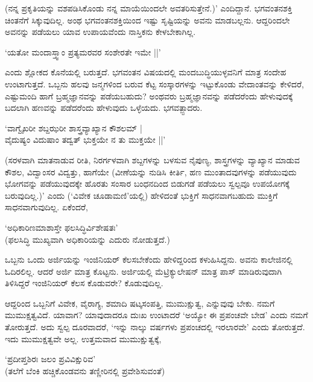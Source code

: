 (ನನ್ನ ಪ್ರಕೃತಿಯನ್ನು ವಶಪಡಿಸಿಕೊಂಡು ನನ್ನ ಮಾಯೆಯಿಂದಲೇ ಅವತರಿಸುತ್ತೇನೆ.)' ಎಂದಿದ್ದಾನೆ. ಭಗವಂತನಶಕ್ತಿ ಚಿಂತನೆಗೆ ಸಿಕ್ಕುವುದಿಲ್ಲ. ಅಂಥ ಭಗವಂತನಶಕ್ತಿಯಿಂದ ಇಷ್ಟು ಸೃಷ್ಟಿಯನ್ನು ಅವನು ಮಾಡಬಲ್ಲನು. ಆದ್ದರಿಂದಲೇ ಅವನನ್ನು ಪಡೆಯಲು ಯಾವ ಉಪಾಯವೆಂದು ನಾಸ್ತಿಕನು ಕೇಳಬೇಕಾಗಿಲ್ಲ.

\begin{shloka}
`ಯತೋ ಮಂದಾಸ್ತ್ವಾಂ ಪ್ರತ್ಯಮರವರ ಸಂಶೇರತೇ ಇಮೇ ||'
\end{shloka}

ಎಂದು ಶ್ಲೋಕದ ಕೊನೆಯಲ್ಲಿ ಬರುತ್ತದೆ. ಭಗವಂತನ ವಿಷಯದಲ್ಲಿ ಮಂದಬುದ್ಧಿಯುಳ್ಳವನಿಗೆ ಮಾತ್ರ ಸಂದೇಹ ಉಂಟಾಗುತ್ತದೆ. ಒಬ್ಬನು ಹಲವು ಜನ್ಮಗಳಿಂದ ಬರುವ ಕೆಟ್ಟ ಸಂಸ್ಕಾರಗಳನ್ನು ಇಟ್ಟುಕೊಂಡು ವೇದಾಂತವನ್ನು ಕೇಳಿದರೆ, ಎಷ್ಟುಮಂದಿ ಹಾಗೆ ಬ್ರಹ್ಮಜ್ಞಾನವನ್ನು ಪಡೆಯಬಹುದು? ಅಂಥವರು ಬ್ರಹ್ಮಜ್ಞಾನವನ್ನು ಪಡೆದರೆಂದು ಹೇಳುವುದಕ್ಕೆ ಬದಲಾಗಿ ಹಣವನ್ನು ಪಡೆದರೆಂದು ಹೇಳುವುದು ಒಳ್ಳೆಯದು. ಭಗವತ್ಪ್ಪಾದರು.

\begin{shloka}
`ವಾಗ್ವೈಖರೀ ಶಬ್ದಝರೀ ಶಾಸ್ತ್ರವ್ಯಾಖ್ಯಾನ ಕೌಶಲಮ್ |\\
ವೈದುಷ್ಯಂ ವಿದುಷಾಂ ತದ್ವತ್ ಭುಕ್ತಯೇ ನ ತು ಮುಕ್ತಯೇ ||'
\end{shloka}

(ಸರಳವಾಗಿ ಮಾತನಾಡುವ ರೀತಿ, ನಿರರ್ಗಳವಾಗಿ ಶಬ್ದಗಳನ್ನು ಬಳಸುವ ನೈಪುಣ್ಯ, ಶಾಸ್ತ್ರಗಳನ್ನು ವ್ಯಾಖ್ಯಾನ ಮಾಡುವ ಕೌಶಲ, ವಿದ್ವಾಂಸರ ವಿದ್ವತ್ತು, ಹಾಗೆಯೇ (ವೀಣೆಯನ್ನು ನುಡಿಸಿ ಕೀರ್ತಿ, ಹಣ ಮುಂತಾದವುಗಳನ್ನು ಪಡೆಯುವುದು ಭೋಗವನ್ನು ಪಡೆಯುವುದಕ್ಕೇ ಹೊರತು ಸಂಸಾರ ಬಂಧನದಿಂದ ಬಿಡುಗಡೆ ಪಡೆಯಲು ಸ್ವಲ್ಪವೂ ಉಪಯೋಗಕ್ಕೆ ಬರುವುದಿಲ್ಲ.)' ಎಂದು (`ವಿವೇಕ ಚೂಡಾಮಣಿ'ಯಲ್ಲಿ) ಹೇಳಿದಂತೆ ಭುಕ್ತಿಗೆ ಸಾಧನವಾಗಬಹುದು ಮುಕ್ತಿಗೆ ಸಾಧನವಾಗುವುದಿಲ್ಲ. ಏಕೆಂದರೆ,

\begin{shloka}
`ಅಧಿಕಾರಿಣಮಾಶಾಸ್ತೇ ಫಲಸಿದ್ಧಿರ್ವಿಶೇಷತಃ'\\
(ಫಲಸಿದ್ಧಿ ಮುಖ್ಯವಾಗಿ ಅಧಿಕಾರಿಯನ್ನು ಎದುರು ನೋಡುತ್ತದೆ.)
\end{shloka}

ಒಬ್ಬನು ಒಂದು ಅರ್ಜಿಯನ್ನು ಇಂಜಿನಿಯರ್ ಕೆಲಸಬೇಕೆಂದು ಹೇಳಿದ್ದರಿಂದ ಕಳುಹಿಸಿದ್ದನು. ಅವನು ಕಾಲೇಜಿನಲ್ಲಿ ಓದಿರಲಿಲ್ಲ. ಆದರೆ ಅರ್ಜಿ ಮಾತ್ರ ಕೊಟ್ಟನು. ಅರ್ಜಿಯಲ್ಲಿ ಮೆಟ್ರಿಕ್ಯುಲೇಷನ್ ಮಾತ್ರ ಪಾಸ್ ಮಾಡಿರುವುದಾಗಿ ತಿಳಿಸಿದ್ದರೆ ಇಂಜಿನಿಯರ್ ಕೆಲಸ ಕೊಡುವರೇ? ಕೊಡುವುದಿಲ್ಲ.

ಆದ್ದರಿಂದ ಒಬ್ಬನಿಗೆ ವಿವೇಕ, ವೈರಾಗ್ಯ, ಶಮಾದಿ ಷಟ್ಕಸಂಪತ್ತಿ, ಮುಮುಕ್ಷುತ್ವ, ಎನ್ನುವುವು ಬೇಕು. ನಮಗೆ ಮುಮುಕ್ಷತ್ವವಿದೆ. ಯಾವಾಗ? ಯಾವುದಾದರೂ ದುಃಖ ಉಂಟಾದರೆ `ಅಯ್ಯೋ ಈ ಪ್ರಪಂಚವೇ ಬೇಡ' ಎಂದು ನಮಗೆ ತೋರುತ್ತದೆ. ಅದು ಸ್ವಲ್ಪ ದೂರವಾದರೆ, `ಇನ್ನು ನಾಲ್ಕು ವರ್ಷಗಳು ಪ್ರಪಂಚದಲ್ಲಿ ಇರಲಾರವೇ' ಎಂದು ತೋರುತ್ತದೆ. ಇದು ಮುಮುಕ್ಷತ್ವವೇ ಅಲ್ಲ. ಉತ್ತಮವಾದ ಮುಮುಕ್ಷುತ್ವಕ್ಕೆ,

\begin{shloka}
`ಪ್ರದೀಪ್ತಶಿರಃ ಜಲಂ ಪ್ರವಿವಿಕ್ಷುರಿವ'\\
(ತಲೆಗೆ ಬೆಂಕಿ ಹಚ್ಚಿಕೊಂಡವನು ತಣ್ಣೀರಿನಲ್ಲಿ ಪ್ರವೇಶಿಸುವಂತೆ)
\end{shloka}

